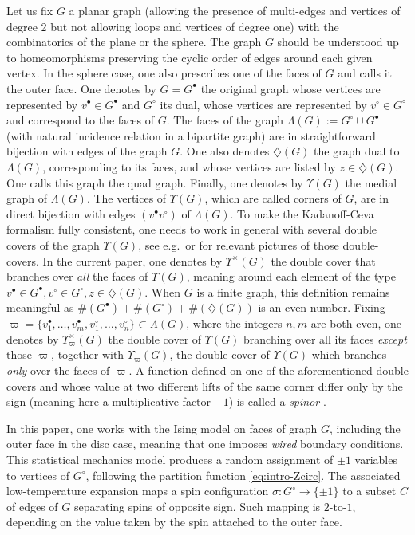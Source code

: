 \documentclass[reqno]{amsart}
\numberwithin{equation}{section}
\theoremstyle{definition}
\theoremstyle{remark}
\newcommand\Dm{\diamondsuit}
\newcommand\vcirc[1]{v^\circ_1,\ldots,v^\circ_{#1}}
\newcommand\vbullet[1]{v^\bullet_1,\ldots,v^\bullet_{#1}}
\begin{document}
Let us fix $G$ a planar graph (allowing the presence of multi-edges and vertices of degree 2 but not allowing loops and vertices of degree one) with the combinatorics of the plane or the sphere. The graph $G$ should be understood up to homeomorphisms preserving the cyclic order of edges around each given  vertex. In the sphere case, one also prescribes one of the faces of $G$ and calls it the outer face. One denotes by $G=G^\bullet$ the original graph whose vertices are represented by $v^\bullet\in G^\bullet$ and $G^\circ$ its dual, whose vertices are represented by $v^\circ\in G^\circ$ and correspond to the faces of $G$. The faces of the graph $\Lambda(G):= G^\circ\cup G^\bullet$ (with natural incidence relation in a bipartite graph) are in straightforward bijection with edges of the graph $G$. One also denotes $\Dm(G)$ the graph dual to $\Lambda(G)$, corresponding to its faces, and whose vertices are listed by \mbox{$z\in\Dm(G)$}. One calls this graph the quad graph. Finally, one denotes by $\Upsilon(G)$ the medial graph of $\Lambda(G)$. The vertices of $\Upsilon(G)$, which are called corners of $G$, are in direct bijection with edges $(v^\bullet v^\circ)$ of $\Lambda(G)$. To make the Kadanoff-Ceva formalism fully consistent, one needs to work in general with several double covers of the graph $\Upsilon(G)$, see e.g.\, \cite[Fig.~27]{Mercat-CMP} or \cite[Fig 3.A]{Che20} for relevant pictures of those double-covers. In the current paper, one denotes by $\Upsilon^\times(G)$ the double cover that branches over \emph{all} the faces of $\Upsilon(G)$, meaning around each element of the type $v^\bullet \in G^\bullet, v^\circ\in G^\circ , z\in \Dm(G)$. When $G$ is a finite graph, this definition remains meaningful as $\#(G^\bullet)+\#(G^\circ)+\#(\Dm(G))$ is an even number. Fixing $\varpi=\{\vbullet{m},\vcirc{n}\}\subset \Lambda(G)$, where the integers $n,m$ are both even, one denotes by $\Upsilon^\times_\varpi(G)$ the double cover of $\Upsilon(G)$ branching over all its faces \emph{except} those $\varpi$, together with $\Upsilon_\varpi(G)$, the double cover of $\Upsilon(G)$ which branches \emph{only} over the faces of $\varpi$. A function defined on one of the aforementioned double covers and whose value at two different lifts of the same corner differ only by the sign (meaning here a multiplicative factor $-1$) is called a \emph{spinor} .


In this paper, one works with the Ising model on faces of graph $G$, including the outer face in the disc case, meaning that one imposes \emph{wired} boundary conditions. This statistical mechanics model produces a random assignment of  $\pm1 $ variables to vertices of $G^\circ$, following the partition function \eqref{eq:intro-Zcirc}. The associated low-temperature expansion \cite[Section 1.2]{CCK} maps a spin configuration $\sigma : G^\circ\to\{\pm 1\}$ to a subset $C$ of edges of $G$ separating spins of opposite sign. Such mapping is $2$-to-$1$, depending on the value taken by the spin attached to the outer face.
\end{document}
